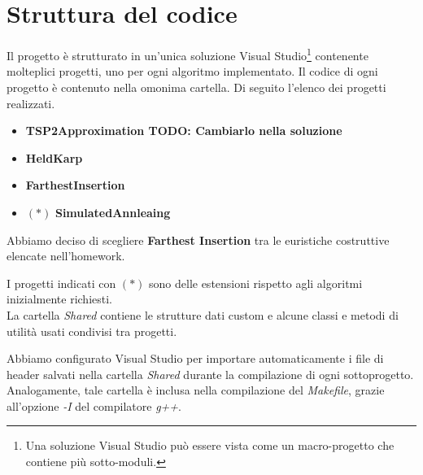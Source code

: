 \section{Struttura del codice}
\label{cap:code-structure}

Il progetto è strutturato in un'unica soluzione Visual Studio\footnote{Una soluzione Visual Studio può essere vista come un macro-progetto che contiene più sotto-moduli.} contenente molteplici progetti, uno per ogni algoritmo implementato. Il codice di ogni progetto è contenuto nella omonima cartella. Di seguito l'elenco dei progetti realizzati.

\begin{itemize}
    \item \textbf{TSP2Approximation TODO: Cambiarlo nella soluzione}
    \item \textbf{HeldKarp}
    \item \textbf{FarthestInsertion}
    \item $(*)$ \textbf{SimulatedAnnleaing}
\end{itemize}

\noindent Abbiamo deciso di scegliere \textbf{Farthest Insertion} tra le euristiche costruttive elencate nell'homework.

\noindent I progetti indicati con $(*)$ sono delle estensioni rispetto agli algoritmi inizialmente richiesti.
\\

\noindent La cartella \textit{Shared} contiene le strutture dati custom e alcune classi e metodi di utilità usati
condivisi tra progetti.

\noindent Abbiamo configurato Visual Studio per importare automaticamente i file di header salvati nella cartella \textit{Shared}
durante la compilazione di ogni sottoprogetto. Analogamente, tale cartella è inclusa nella compilazione del \textit{Makefile}, grazie all'opzione \textit{-I} del compilatore \textit{g++}.

